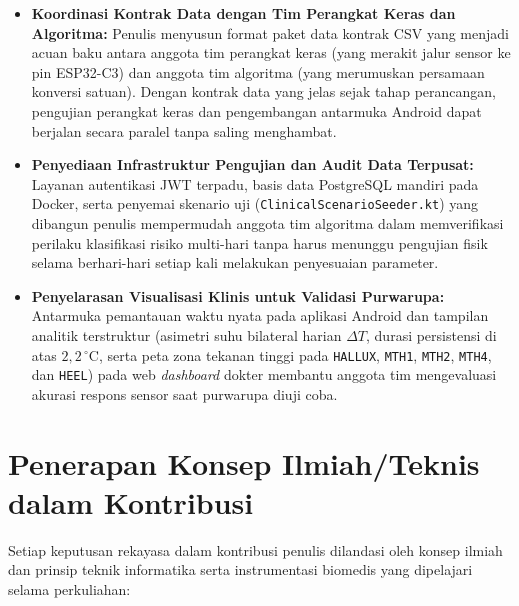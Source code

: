\begin{itemize}
    \item \textbf{Koordinasi Kontrak Data dengan Tim Perangkat Keras dan Algoritma:} Penulis menyusun format paket data kontrak CSV yang menjadi acuan baku antara anggota tim perangkat keras (yang merakit jalur sensor ke pin ESP32-C3) dan anggota tim algoritma (yang merumuskan persamaan konversi satuan). Dengan kontrak data yang jelas sejak tahap perancangan, pengujian perangkat keras dan pengembangan antarmuka Android dapat berjalan secara paralel tanpa saling menghambat.
    \item \textbf{Penyediaan Infrastruktur Pengujian dan Audit Data Terpusat:} Layanan autentikasi JWT terpadu, basis data PostgreSQL mandiri pada Docker, serta penyemai skenario uji (\texttt{ClinicalScenarioSeeder.kt}) yang dibangun penulis mempermudah anggota tim algoritma dalam memverifikasi perilaku klasifikasi risiko multi-hari tanpa harus menunggu pengujian fisik selama berhari-hari setiap kali melakukan penyesuaian parameter.
    \item \textbf{Penyelarasan Visualisasi Klinis untuk Validasi Purwarupa:} Antarmuka pemantauan waktu nyata pada aplikasi Android dan tampilan analitik terstruktur (asimetri suhu bilateral harian $\Delta T$, durasi persistensi di atas $2{,}2\,^\circ\mathrm{C}$, serta peta zona tekanan tinggi pada \texttt{HALLUX}, \texttt{MTH1}, \texttt{MTH2}, \texttt{MTH4}, dan \texttt{HEEL}) pada web \textit{dashboard} dokter membantu anggota tim mengevaluasi akurasi respons sensor saat purwarupa diuji coba.
\end{itemize}

\section{Penerapan Konsep Ilmiah/Teknis dalam Kontribusi}
\label{sec:konsep_ilmiah}

Setiap keputusan rekayasa dalam kontribusi penulis dilandasi oleh konsep ilmiah dan prinsip teknik informatika serta instrumentasi biomedis yang dipelajari selama perkuliahan:

